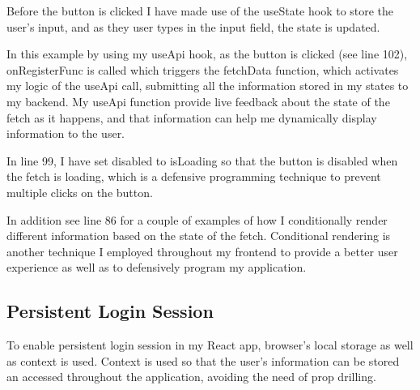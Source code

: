 Before the button is clicked I have made use of the useState hook to store the user's input, and as they user types in the input field, the state is updated.

In this example by using my useApi hook, as the button is clicked (see line 102), onRegisterFunc is called which triggers the fetchData function, which activates my logic of the useApi call, submitting all the information stored in my states to my backend. My useApi function provide live feedback about the state of the fetch as it happens, and that information can help me dynamically display information to the user.

In line 99, I have set disabled to isLoading so that the button is disabled when the fetch is loading, which is a defensive programming technique to prevent multiple clicks on the button. 

In addition see line 86 for a couple of examples of how I conditionally render different information based on the state of the fetch. Conditional rendering is another technique I employed throughout my frontend to provide a better user experience as well as to defensively program my application.

\subsection{Persistent Login Session}
To enable persistent login session in my React app, browser's local storage as well as context is used. Context is used so that the user's information can be stored an accessed throughout the application, avoiding the need of prop drilling. 




